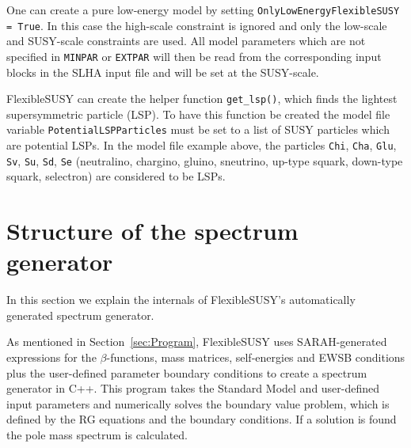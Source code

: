 \documentclass[final,3p,11pt,pdflatex]{elsarticle}
\makeatletter
\newcommand{\fs}{FlexibleSUSY\@\xspace}
\newcommand{\code}[1]{\lstinline|#1|}  %
\newcommand{\secref}[1]{Section~\ref{#1}}
\makeatother
\begin{document}
One can create a pure low-energy model by setting
\code{OnlyLowEnergyFlexibleSUSY = True}.  In this case the high-scale
constraint is ignored and only the low-scale and SUSY-scale
constraints are used.  All model parameters which are not specified in
\code{MINPAR} or \code{EXTPAR} will then be read from the
corresponding input blocks in the SLHA input file and will be set at
the SUSY-scale.

\fs can create the helper function \code{get_lsp()}, which finds the
lightest supersymmetric particle (LSP).  To have this function be
created the model file variable \code{PotentialLSPParticles} must be
set to a list of SUSY particles which are potential LSPs.  In the
model file example above, the particles \code{Chi}, \code{Cha},
\code{Glu}, \code{Sv}, \code{Su}, \code{Sd}, \code{Se} (neutralino,
chargino, gluino, sneutrino, up-type squark, down-type squark,
selectron) are considered to be LSPs.

\section{Structure of the spectrum generator}
\label{sec:SpecGenStruct}

In this section we explain the internals of \fs's automatically
generated spectrum generator.

As mentioned in \secref{sec:Program}, \fs uses SARAH-generated
expressions for the $\beta$-functions, mass matrices, self-energies
and EWSB conditions plus the user-defined parameter boundary
conditions to create a spectrum generator in C++.  This program takes
the Standard Model and user-defined input parameters and numerically
solves the boundary value problem, which is defined by the RG
equations and the boundary conditions.  If a solution is found the
pole mass spectrum is calculated.
\end{document}
